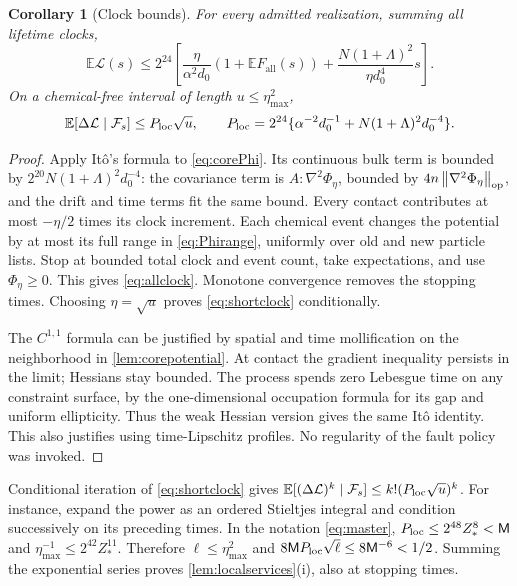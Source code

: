 \documentclass[11pt]{article}
\numberwithin{equation}{section}
\newtheorem{corollary}[theorem]{Corollary}
\theoremstyle{definition}
\theoremstyle{remark}\newtheorem{remark}[theorem]{Remark}
\newcommand{\E}{\mathbb E}
\newcommand{\Ff}{F_{\mathrm{all}}}
\newcommand{\norm}[1]{\left\|#1\right\|}
\begin{document}
\begin{corollary}[Clock bounds]\label{cor:clocks}
For every admitted realization, summing all lifetime clocks,
\begin{equation}\label{eq:allclock}
 \E\mathcal L(s)\le2^{24}\left[
 \frac{\eta}{\alpha^2d_0}(1+\E\Ff(s))
 +\frac{N(1+\Lambda)^2}{\eta d_0^4}s\right].
\end{equation}
On a chemical-free interval of length $u\le\eta_{\max}^2$,
\begin{equation}\label{eq:shortclock}
 \E[\Delta\mathcal L\mid\mathcal F_s]
 \le P_{\rm loc}\sqrt u,\qquad
 P_{\rm loc}=2^{24}\{\alpha^{-2}d_0^{-1}
                       +N(1+\Lambda)^2d_0^{-4}\}.
\end{equation}
\end{corollary}
\begin{proof}
Apply It\^o's formula to \eqref{eq:corePhi}. Its continuous bulk term is
bounded by $2^{20}N(1+\Lambda)^2d_0^{-4}$: the covariance term is
$A:\nabla^2\Phi_\eta$, bounded by $4n\norm{\nabla^2\Phi_\eta}_{\rm op}$,
and the drift and time terms fit the same bound. Every contact contributes
at most $-\eta/2$ times its clock increment. Each chemical event changes
the potential by at most its full range in \eqref{eq:Phirange}, uniformly
over old and new particle lists. Stop at bounded total clock and event
count, take expectations, and use $\Phi_\eta\ge0$. This gives
\eqref{eq:allclock}. Monotone convergence removes the stopping times.
Choosing $\eta=\sqrt u$ proves \eqref{eq:shortclock} conditionally.

The $C^{1,1}$ formula can be justified by spatial and time mollification
on the neighborhood in \cref{lem:corepotential}. At contact the gradient
inequality persists in the limit; Hessians stay bounded. The process spends
zero Lebesgue time on any constraint surface, by the one-dimensional
occupation formula for its gap and uniform ellipticity. Thus the weak
Hessian version gives the same It\^o identity. This also justifies using
time-Lipschitz profiles. No regularity of the fault policy was invoked.
\end{proof}

Conditional iteration of \eqref{eq:shortclock} gives
$\E[(\Delta\mathcal L)^k\mid\mathcal F_s]\le k!(P_{\rm loc}\sqrt u)^k$.
For instance, expand the power as an ordered Stieltjes integral and
condition successively on its preceding times. In the notation
\eqref{eq:master}, $P_{\rm loc}\le2^{48}Z_*^8<\mathsf M$ and
$\eta_{\max}^{-1}\le2^{42}Z_*^{11}$. Therefore $\ell\le\eta_{\max}^2$
and $8\mathsf M P_{\rm loc}\sqrt\ell\le8\mathsf M^{-6}<1/2$.
Summing the exponential series proves
\cref{lem:localservices}(i), also at stopping times.
\end{document}
